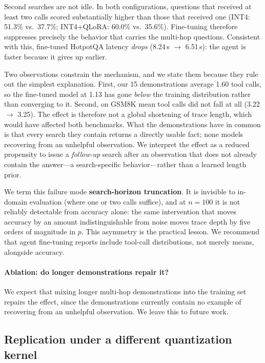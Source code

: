 \documentclass{article}
\begin{document}
Second searches are not idle. In both configurations, questions that
received at least two calls scored substantially higher than those that
received one (INT4: 51.3\% vs.\ 37.7\%; INT4+QLoRA: 60.0\% vs.\ 35.6\%).
Fine-tuning therefore suppresses precisely the behavior that carries the
multi-hop questions. Consistent with this, fine-tuned HotpotQA latency
\emph{drops} (8.24\,s $\rightarrow$ 6.51\,s): the agent is faster because
it gives up earlier.

Two observations constrain the mechanism, and we state them because they
rule out the simplest explanation. First, our 15 demonstrations average
1.60 tool calls, so the fine-tuned model at 1.13 has gone \emph{below}
the training distribution rather than converging to it. Second, on GSM8K
mean tool calls did not fall at all (3.22 $\rightarrow$ 3.25). The effect
is therefore not a global shortening of trace length, which would have
affected both benchmarks. What the demonstrations have in common is that
every search they contain returns a directly usable fact; none models
recovering from an unhelpful observation. We interpret the effect as a
reduced propensity to issue a \emph{follow-up} search after an
observation that does not already contain the answer---a search-specific
behavior---rather than a learned length prior.

We term this failure mode \textbf{search-horizon truncation}. It is
invisible to in-domain evaluation (where one or two calls suffice), and at
$n{=}100$ it is not reliably detectable from accuracy alone: the same
intervention that moves accuracy by an amount indistinguishable from noise
moves trace depth by five orders of magnitude in $p$. This asymmetry is the
practical lesson. We recommend that agent fine-tuning reports include
tool-call distributions, not merely means, alongside accuracy.

\paragraph{Ablation: do longer demonstrations repair it?}
We expect that mixing longer multi-hop demonstrations into the training set
repairs the effect, since the demonstrations currently contain no example of
recovering from an unhelpful observation. We leave this to future work.

\subsection{Replication under a different quantization kernel}
\label{sec:replication}
\end{document}

